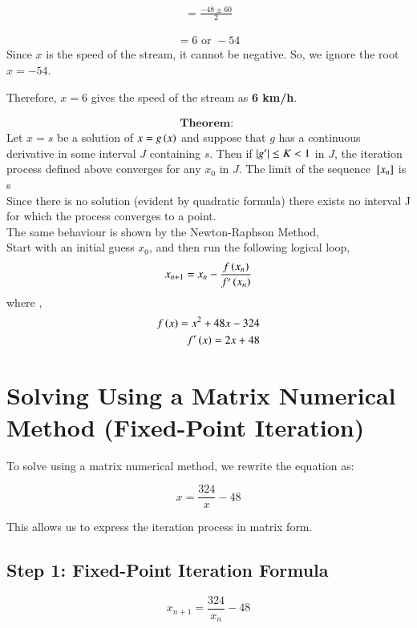 \documentclass[article]{IEEEtran}
\numberwithin{figure}{enumi}
\begin{document}
\begin{align}
= \frac{-48 \pm 60}{2}
\end{align}

\begin{align}
= 6 \text{ or } -54
\end{align}
Since \( x \) is the speed of the stream, it cannot be negative. So, we ignore the root \( x = -54 \). 

Therefore, \( x = 6 \) gives the speed of the stream as \textbf{6 km/h}.

\begin{align}
    \textbf{Theorem: }
\end{align}
    Let $x = s$ be a solution of $x = g\left(x\right)$ and suppose that $g$ has a continuous
    derivative in some interval $J$ containing $s$. Then if $\left\vert g^{\prime}\right\vert \le K < 1$ in $J$,
    the iteration process defined  above converges for any $x_0$ in $J$. The limit of the sequence
    ${}\left[x_n\right]$ is s\\
\newline
Since there is no solution (evident by quadratic formula) there exists no interval J for which
the process converges to a point.\\
\newline
The same behaviour is shown by the Newton-Raphson Method,\\
Start with an initial guess $x_0$, and then run the following logical loop,
\begin{align}
    x_{n+1} = x_n - \frac{f\left(x_n\right)}{f^{\prime}\left(x_n\right)} 
\end{align}
where ,
\begin{align}
    f\left(x\right) = x^2 + 48x - 324\\
    f^{\prime}\left(x\right) = 2x+48
\end{align}




\section*{Solving Using a Matrix Numerical Method (Fixed-Point Iteration)}

To solve using a matrix numerical method, we rewrite the equation as:

\[
x = \frac{324}{x} - 48
\]

This allows us to express the iteration process in matrix form.

\subsection*{Step 1: Fixed-Point Iteration Formula}
\[
x_{n+1} = \frac{324}{x_n} - 48
\]
\end{document}
